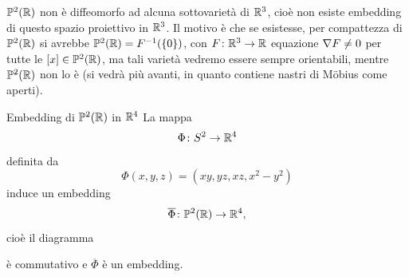 \documentclass[a4paper]{article}
\begin{document}
\(\mathbb P^2(\mathbb{R})\)
non è diffeomorfo ad alcuna sottovarietà di \(\mathbb{R}^3\),
cioè non esiste embedding di questo spazio proiettivo in \(\mathbb{R}^3\).
Il motivo è che se esistesse, per compattezza di \(\mathbb P^2(\mathbb{R})\)
si avrebbe \(\mathbb P^2(\mathbb{R}) = F^{-1}(\{0\})\), con
\(F \colon \mathbb{R}^3 \to \mathbb{R}\)
equazione \(\nabla F \neq 0\) per tutte le \([x] \in \mathbb P^2(\mathbb{R})\),
ma tali varietà vedremo essere sempre
orientabili, mentre \(\mathbb P^2(\mathbb{R})\)
non lo è
(si vedrà più avanti, in quanto contiene nastri di Möbius come aperti).


\begin{snippetproposition}{Embedding di \(\mathbb P^2(\mathbb{R})\) in \(\mathbb{R}^4\)}
    La mappa
    \[
        \Phi \colon S^2 \to \mathbb{R}^4
    \]
    definita da
    \[
        \Phi(x,y,z) = (xy, yz, xz, x^2 - y^2)
    \]
    induce un embedding
    \[
        \overline\Phi \colon \mathbb P^2(\mathbb{R}) \to \mathbb{R}^4,
    \]
    cioè il diagramma
    \begin{center}
    \end{center}
    è commutativo e \(\overline\Phi\) è un embedding.
\end{snippetproposition}
\end{document}
